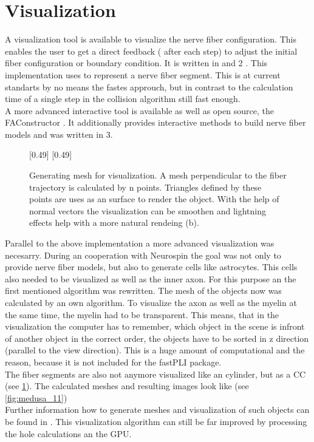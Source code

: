 \section{Visualization}\label{sec:visualization}
% 
% 
% 
A visualization tool is available to visualize the nerve fiber configuration.
This enables the user to get a direct feedback (\eg{} after each step) to adjust the initial fiber configuration or boundary condition.
It is written in \cpp{} and \opengl{} 2 \cite{isocpp, khronos}.
This implementation uses  to represent a nerve fiber segment. 
This is at current standarts by no means the fastes approuch, but in contrast to the calculation time of a single step in the collision algorithm still fast enough.
\\
A more advanced interactive tool is available as well as open source, the FAConstructor \cite{Reuter2019}.
It additionally provides interactive methods to build nerve fiber models and was written in \opengl{} 3.
\par
% 
% 
\begin{figure}[!t]
    \setlength{\tikzwidth}{0.5\textwidth}
    [0.49\textwidth]{
    }
    [0.49\textwidth]{
    }
	\caption[Nerve fiber visualization example]{Generating mesh for visualization. A mesh perpendicular to the fiber trajectory is calculated by n points. Triangles defined by these points are uses as an surface to render the object. With the help of normal vectors the visualization can be smoothen and lightning effects help with a more natural rendeing (b).}
	\label{fig:vis_mesh}
\end{figure}
% 
Parallel to the above implementation a more advanced visualization was necesarry.
During an cooperation with Neurospin \dummy{} the goal was not only to provide nerve fiber models, but also to generate cells like astrocytes.
This cells also needed to be visualized as well as the inner axon.
For this purpose an the first mentioned algorithm was rewritten.
The mesh of the objects now was calculated by an own algorithm.
To visualize the axon as well as the myelin at the same time, the myelin had to be transparent. 
This means, that in the visualization the computer has to remember, which object in the scene is infront of another object in the correct order, \ie{} the objects have to be sorted in z direction (parallel to the view direction).
This is a huge amount of computational \dummy{} and the reason, because it is not included for the \ac{fastPLI} package.
\\
The fiber segments are also not anymore visualized like an cylinder, but as a \ac{CC} (see \cref{fig:vis_mesh}). 
The calculated meshes and resulting images look like (see \cref{fig:medusa_11})
\\
Further information how to generate meshes and visualization of such objects can be found in \dummy{}.
This visualization algorithm can still be far improved by processing the hole calculations an the \ac{GPU}.

